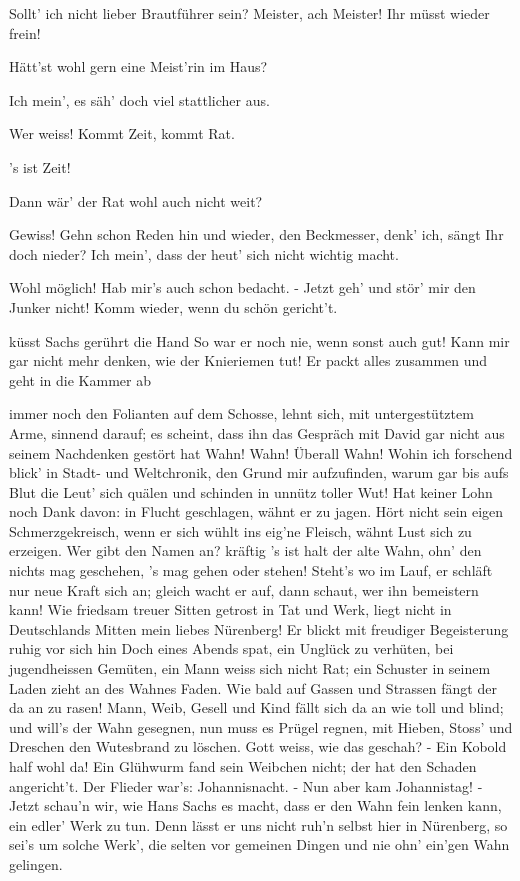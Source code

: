 \begin{drama}
\Davidspeaks
Sollt' ich nicht lieber Brautführer sein?
Meister, ach Meister! Ihr müsst wieder frein!

\Sachsspeaks
Hätt'st wohl gern eine Meist'rin im Haus?

\Davidspeaks
Ich mein', es säh' doch viel stattlicher aus.

\Sachsspeaks
Wer weiss! Kommt Zeit, kommt Rat.

\Davidspeaks
's ist Zeit!

\Sachsspeaks
Dann wär' der Rat wohl auch nicht weit?

\Davidspeaks
Gewiss! Gehn schon Reden hin und wieder,
den Beckmesser, denk' ich, sängt Ihr doch nieder?
Ich mein', dass der heut' sich nicht wichtig macht.

\Sachsspeaks
Wohl möglich! Hab mir's auch schon bedacht. -
Jetzt geh' und stör' mir den Junker nicht!
Komm wieder, wenn du schön gericht't.

\Davidspeaks
küsst Sachs gerührt die Hand
So war er noch nie, wenn sonst auch gut!
Kann mir gar nicht mehr denken, wie der Knieriemen tut!
Er packt alles zusammen und geht in die Kammer ab

\Sachsspeaks
immer noch den Folianten auf dem Schosse, lehnt sich, mit untergestütztem Arme, sinnend darauf; es scheint, dass ihn das Gespräch mit David gar nicht aus seinem Nachdenken gestört hat
Wahn! Wahn! Überall Wahn!
Wohin ich forschend blick'
in Stadt- und Weltchronik,
den Grund mir aufzufinden,
warum gar bis aufs Blut
die Leut' sich quälen und schinden
in unnütz toller Wut!
Hat keiner Lohn noch Dank davon:
in Flucht geschlagen, wähnt er zu jagen.
Hört nicht sein eigen Schmerzgekreisch,
wenn er sich wühlt ins eig'ne Fleisch,
wähnt Lust sich zu erzeigen.
Wer gibt den Namen an?
kräftig
's ist halt der alte Wahn,
ohn' den nichts mag geschehen,
's mag gehen oder stehen!
Steht's wo im Lauf,
er schläft nur neue Kraft sich an;
gleich wacht er auf,
dann schaut, wer ihn bemeistern kann!
Wie friedsam treuer Sitten
getrost in Tat und Werk,
liegt nicht in Deutschlands Mitten
mein liebes Nürenberg!
Er blickt mit freudiger Begeisterung ruhig vor sich hin
Doch eines Abends spat,
ein Unglück zu verhüten,
bei jugendheissen Gemüten,
ein Mann weiss sich nicht Rat;
ein Schuster in seinem Laden
zieht an des Wahnes Faden.
Wie bald auf Gassen und Strassen
fängt der da an zu rasen!
Mann, Weib, Gesell und Kind
fällt sich da an wie toll und blind;
und will's der Wahn gesegnen,
nun muss es Prügel regnen,
mit Hieben, Stoss' und Dreschen
den Wutesbrand zu löschen.
Gott weiss, wie das geschah? -
Ein Kobold half wohl da!
Ein Glühwurm fand sein Weibchen nicht;
der hat den Schaden angericht't.
Der Flieder war's:
Johannisnacht. -
Nun aber kam Johannistag! -
Jetzt schau'n wir, wie Hans Sachs es macht,
dass er den Wahn fein lenken kann,
ein edler' Werk zu tun.
Denn lässt er uns nicht ruh'n
selbst hier in Nürenberg,
so sei's um solche Werk',
die selten vor gemeinen Dingen
und nie ohn' ein'gen Wahn gelingen.



\end{drama}
